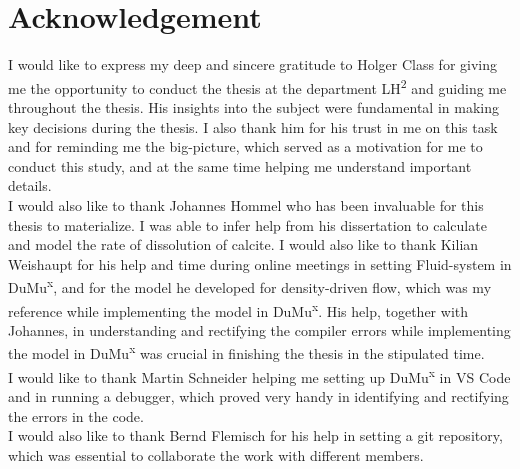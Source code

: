 \chapter*{Acknowledgement}
\thispagestyle{empty}
I would like to express my deep and sincere gratitude to Holger Class for giving me the opportunity 
to conduct the thesis at the department LH\textsuperscript{2} and guiding me throughout the thesis. 
His insights into the subject were fundamental in making key decisions during the thesis. 
I also thank him for his trust in me on this task and for reminding me the big-picture, which 
served as a motivation for me to conduct this study, and at the same time helping me understand 
important details. \\

I would also like to thank Johannes Hommel who has been invaluable for this thesis to materialize. 
I was able to infer help from his dissertation to calculate and model the rate of dissolution of calcite. 
I would also like to thank Kilian Weishaupt for his help and time during online meetings in setting 
Fluid-system in DuMu\textsuperscript{x}, and for the model he developed for density-driven flow, 
which was my reference while implementing the model in DuMu\textsuperscript{x}. His help, together 
with Johannes, in understanding and rectifying the compiler errors while implementing the model in 
DuMu\textsuperscript{x} was crucial in finishing the thesis in the stipulated time.\\

I would like to thank Martin Schneider helping me setting up DuMu\textsuperscript{x} in VS Code 
and in running a debugger, which proved very handy in identifying and rectifying the errors in the code. \\
I would also like to thank Bernd Flemisch for his help in setting a git repository, which was essential 
to collaborate the work with different members.
\endinput